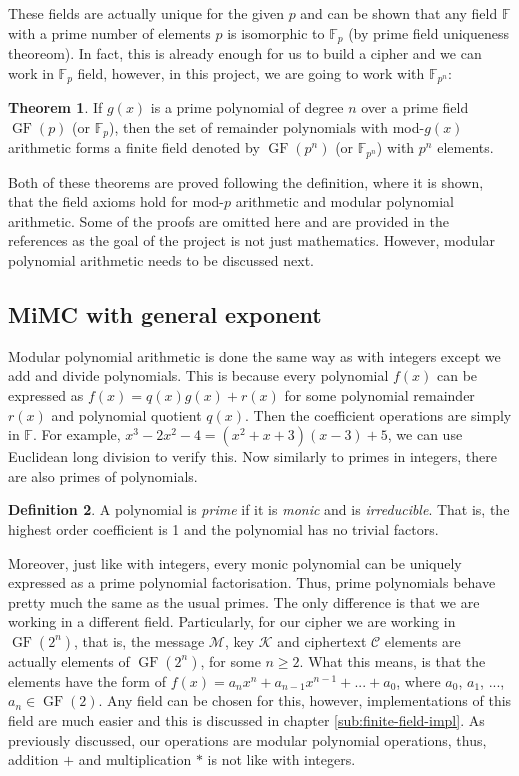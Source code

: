 \documentclass{Resources/UoBLab1}
\theoremstyle{definition}
\newtheorem{theorem}{Theorem}[section]
\newtheorem{definition}[theorem]{Definition}
\begin{document}
These fields are actually unique for the given $p$ and can be shown that any field $\mathbb{F}$ with a prime number of elements $p$ is isomorphic to $\mathbb{F}_p$ (by prime field uniqueness theoreom\cite{FieldNotes}). In fact, this is already enough for us to build a cipher and we can work in $\mathbb{F}_p$ field, however, in this project, we are going to work with $\mathbb{F}_{p^n}$:
\begin{theorem}
    If $g(x)$ is a prime polynomial of degree $n$ over a prime field $\operatorname{GF}(p)$ (or $\mathbb{F}_p$), then the set of remainder polynomials with mod-$g(x)$ arithmetic forms a finite field denoted by $\operatorname{GF}(p^n)$ (or $\mathbb{F}_{p^n}$) with $p^n$ elements.
\end{theorem}
Both of these theorems are proved following the definition, where it is shown, that the field axioms hold for mod-$p$ arithmetic and modular polynomial arithmetic\cite{FieldNotes}. Some of the proofs are omitted here and are provided in the references as the goal of the project is not just mathematics. However, modular polynomial arithmetic needs to be discussed next.

\subsection{MiMC with general exponent}\label{sub:mimcge}
Modular polynomial arithmetic is done the same way as with integers except we add and divide polynomials. This is because every polynomial $f(x)$ can be expressed as $f(x) = q(x)g(x) + r(x)$ for some polynomial remainder $r(x)$ and polynomial quotient $q(x)$. Then the coefficient operations are simply in $\mathbb{F}$. For example, \(x^3-2x^2-4 = (x^2+x+3)(x-3) + 5\), we can use Euclidean long division to verify this. Now similarly to primes in integers, there are also primes of polynomials.
\begin{definition}\label{def:prime-poly}
    A polynomial is \textit{prime} if it is \textit{monic} and is \textit{irreducible}. That is, the highest order coefficient is 1 and the polynomial has no trivial factors.
\end{definition}
Moreover, just like with integers, every monic polynomial can be uniquely expressed as a prime polynomial factorisation. Thus, prime polynomials behave pretty much the same as the usual primes. The only difference is that we are working in a different field. Particularly, for our cipher we are working in $\operatorname{GF}(2^n)$, that is, the message $\mathcal{M}$, key $\mathcal{K}$ and ciphertext $\mathcal{C}$ elements are actually elements of $\operatorname{GF}(2^n)$, for some $n \ge 2$. What this means, is that the elements have the form of $f(x) = a_nx^n + a_{n-1}x^{n-1} + ... + a_0$, where $a_0$, $a_1$, ..., $a_n \in \operatorname{GF}(2)$. Any field can be chosen for this, however, implementations of this field are much easier and this is discussed in chapter \ref{sub:finite-field-impl}. As previously discussed, our operations are modular polynomial operations, thus, addition $+$ and multiplication $*$ is not like with integers.\medskip
\end{document}
